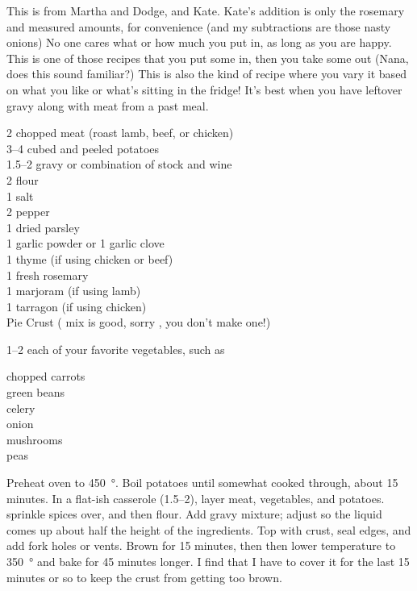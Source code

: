 \begin{open}
  This is from Martha and Dodge, and Kate. Kate's addition is only the rosemary and measured amounts, for convenience (and my subtractions are those nasty onions) No one cares what or how much you put in, as long as you are happy. This is one of those recipes that you put some in, then you take some out
  (Nana, does this sound familiar?) This is also the kind of recipe where you vary it based on what you like or what's sitting in the fridge! It's best when you have leftover gravy along with meat from a past meal.
\end{open}
\begin{ingredients}
  \SI{2}{\cup} chopped meat (roast lamb, beef, or chicken)\\
  \numrange{3}{4} cubed and peeled potatoes\\
  \SIrange{1.5}{2}{\cup} gravy or combination of stock and wine\\
  \SI{2}{\tblspoon} flour\\
  \SI{1}{\teaspoon} salt\\
  \SI{2}{\teaspoon} pepper\\
  \SI{1}{\tblspoon} dried parsley\\
  \SI{1}{\teaspoon} garlic powder or 1 garlic clove\\
  \SI{1}{\teaspoon} thyme (if using chicken or beef)\\
  \SI{1}{\tblspoon} fresh rosemary \\
  \SI{1}{\teaspoon} marjoram (if using lamb)\\
  \SI{1}{\teaspoon} tarragon (if using chicken)\\
  Pie Crust ( mix is good, sorry
  , you don't make one!)
\end{ingredients}
\SIrange{1}{2}{\cup} each of your favorite vegetables, such as
\begin{ingredients}
  chopped carrots\\
  green beans\\
  celery\\
  onion\\
  mushrooms\\
  peas
\end{ingredients}
Preheat oven to \SI{450}{\degree}. Boil potatoes until somewhat cooked through, about
15 minutes. In a flat-ish casserole (\SIrange{1.5}{2}{\quart}), layer meat,
vegetables, and potatoes. sprinkle spices over, and then flour. Add gravy
mixture; adjust so the liquid comes up about half the height of the
ingredients.  Top with crust, seal edges, and add fork holes or vents. Brown
for 15 minutes, then then lower temperature to \SI{350}{\degree} and bake for
45 minutes longer. I find that I have to cover it for the last
15 minutes or so to keep the crust from getting too brown.

